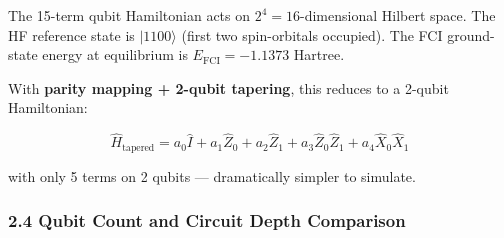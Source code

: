 \documentclass[
  11pt,
]{report}
\begin{document}
The 15-term qubit Hamiltonian acts on \(2^4 = 16\)-dimensional Hilbert
space. The HF reference state is \(|1100\rangle\) (first two
spin-orbitals occupied). The FCI ground-state energy at equilibrium is
\(E_{\text{FCI}} = -1.1373\) Hartree.

With \textbf{parity mapping + 2-qubit tapering}, this reduces to a
2-qubit Hamiltonian:

\[\hat{H}_{\text{tapered}} = a_0\hat{I} + a_1\hat{Z}_0 + a_2\hat{Z}_1 + a_3\hat{Z}_0\hat{Z}_1 + a_4\hat{X}_0\hat{X}_1\]

with only 5 terms on 2 qubits --- dramatically simpler to simulate.

\subsubsection{2.4 Qubit Count and Circuit Depth
Comparison}\label{qubit-count-and-circuit-depth-comparison}
\end{document}
